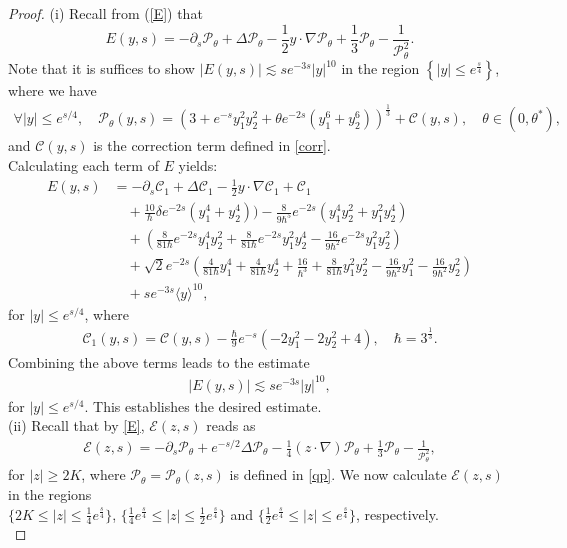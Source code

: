 \documentclass[11pt,reqno]{amsart}
\theoremstyle{definition}
\theoremstyle{bfremark}
\numberwithin{equation}{section}
\begin{document}
\begin{proof}
(i) Recall from (\ref{E}) that
\begin{equation*}
    E(y,s)=-\partial_s\mathcal{P}_{\theta}+\Delta \mathcal{P}_{\theta}-\frac{1}{2}y \cdot \nabla \mathcal{P}_{\theta}+\frac{1}{3}\mathcal{P}_{\theta}-\frac{1}{\mathcal{P}_{\theta}^2}.
\end{equation*}
Note that it is suffices to show \(|E(y,s)| \lesssim se^{-3s}|y|^{10}\) in the region \(\left\{|y| \leq e^{\frac{s}{4}}\right\}\), where we have 
\begin{align*}
   \forall |y| \leq e^{s/4}, \quad  \mathcal{P}_{\theta}(y,s)=\left(3+e^{-s}y_1^2y_2^2+\theta e^{-2s}(y_1^6+y_2^6)\right)^{\frac{1}{3}}+\mathcal{C}(y,s), \quad  \theta \in (0,\theta^*),
\end{align*}
and \(\mathcal{C}(y,s)\) is the correction term defined in \ref{corr}.\\

Calculating each term of \(E\) yields:
\begin{align*}
    E(y,s)&=-\partial_s\mathcal{C}_1+\Delta \mathcal{C}_1-\frac{1}{2}y \cdot \nabla \mathcal{C}_1+\mathcal{C}_1\\
    & \quad + \frac{10}{\hbar} \delta e^{-2s}(y_1^4+y_2^4))-\frac{8}{9\hbar^5}e^{-2s}(y_1^4y_2^2+y_1^2y_2^4)\\
    & \quad +\left(\frac{8}{81\hbar}e^{-2s}y_1^4y_2^2+\frac{8}{81\hbar}e^{-2s}y_1^2y_2^4-\frac{16}{9\hbar^2}e^{-2s}y_1^2y_2^2\right)\\
    & \quad + \sqrt{2}e^{-2s}\left(\frac{4}{81\hbar}y_1^4+\frac{4}{81\hbar}y_2^4+\frac{16}{\hbar^3}+\frac{8}{81\hbar}y_1^2y_2^2-\frac{16}{9\hbar^2}y_1^2-\frac{16}{9\hbar^2}y_2^2\right)\\
    & \quad +se^{-3s}\langle y\rangle^{10},
\end{align*}
for \(|y| \leq e^{s/4}\), where 
\begin{align*}
\mathcal{C}_1(y,s)=\mathcal{C}(y,s)-\frac{\hbar}{9} e^{-s} (-2 y_1^2 - 2 y_2^2 + 4), \quad \hbar=3^{\frac{1}{3}}.
\end{align*}
Combining the above terms leads to the estimate
\begin{align*}
    |E(y,s)|\lesssim se^{-3s}|y|^{10},
\end{align*}
for \(|y| \leq e^{s/4}\). This establishes the desired estimate.\\
(ii) Recall that by \ref{E}, \(\mathcal{E}(z,s)\) reads as
\begin{align*}
    \mathcal{E}(z,s)=-\partial_s\mathcal{P}_{\theta}+e^{-s/2}\Delta \mathcal{P}_{\theta}-\frac{1}{4}(z \cdot \nabla)\mathcal{P}_{\theta}+\frac{1}{3}\mathcal{P}_{\theta}-\frac{1}{\mathcal{P}_{\theta}^2},
\end{align*}
for \(|z| \geq 2K\), where \(\mathcal{P_{\theta}=\mathcal{P_{\theta}}}(z,s)\) is defined in \ref{qp}. We now calculate \(\mathcal{E}(z,s)\) in the regions\\ \(\{2K \leq |z| \leq \frac{1}{4}e^{\frac{s}{4}}\}\), \(\{\frac{1}{4}e^{\frac{s}{4}} \leq |z| \leq \frac{1}{2}e^{\frac{s}{4}}\}\) and \(\{\frac{1}{2}e^{\frac{s}{4}} \leq |z| \leq e^{\frac{s}{4}}\}\), respectively.\\


\end{proof}
\end{document}

